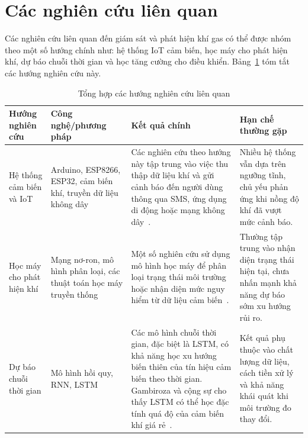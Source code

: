 \section{Các nghiên cứu liên quan}

Các nghiên cứu liên quan đến giám sát và phát hiện khí gas có thể được nhóm theo một số hướng chính như: hệ thống IoT cảm biến, học máy cho phát hiện khí, dự báo chuỗi thời gian và học tăng cường cho điều khiển. Bảng~\ref{tab:related_work_summary} tóm tắt các hướng nghiên cứu này.

\begingroup
\small
\renewcommand{\arraystretch}{1.25}
\setlength{\tabcolsep}{3pt}

\begin{longtable}{
  >{\raggedright\arraybackslash}p{2.8cm}
  >{\raggedright\arraybackslash}p{3.5cm}
  >{\raggedright\arraybackslash}p{4.2cm}
  >{\raggedright\arraybackslash}p{3.2cm}
}
\caption{Tổng hợp các hướng nghiên cứu liên quan}
\label{tab:related_work_summary} \\
\toprule
\textbf{Hướng nghiên cứu} 
& \textbf{Công nghệ/phương pháp} 
& \textbf{Kết quả chính} 
& \textbf{Hạn chế thường gặp} \\
\midrule
\endfirsthead

\endhead

\endfoot

\bottomrule
\endlastfoot

Hệ thống cảm biến và IoT
& Arduino, ESP8266, ESP32, cảm biến khí, truyền dữ liệu không dây
& Các nghiên cứu theo hướng này tập trung vào việc thu thập dữ liệu khí và gửi cảnh báo đến người dùng thông qua SMS, ứng dụng di động hoặc mạng không dây~\cite{saranya2023,nwazor2023,guo2019}.
& Nhiều hệ thống vẫn dựa trên ngưỡng tĩnh, chủ yếu phản ứng khi nồng độ khí đã vượt mức cảnh báo. \\

\addlinespace

Học máy cho phát hiện khí
& Mạng nơ-ron, mô hình phân loại, các thuật toán học máy truyền thống
& Một số nghiên cứu sử dụng mô hình học máy để phân loại trạng thái môi trường hoặc nhận diện mức nguy hiểm từ dữ liệu cảm biến~\cite{abbas2021,kutcharlapati2023}.
& Thường tập trung vào nhận diện trạng thái hiện tại, chưa nhấn mạnh khả năng dự báo sớm xu hướng rủi ro. \\

\addlinespace

Dự báo chuỗi thời gian
& Mô hình hồi quy, RNN, LSTM
& Các mô hình chuỗi thời gian, đặc biệt là LSTM, có khả năng học xu hướng biến thiên của tín hiệu cảm biến theo thời gian. Gambiroza và cộng sự cho thấy LSTM có thể học đặc tính quá độ của cảm biến khí giá rẻ~\cite{gambiroza2020}.
& Kết quả phụ thuộc vào chất lượng dữ liệu, cách tiền xử lý và khả năng khái quát khi môi trường đo thay đổi. \\


\end{longtable}
